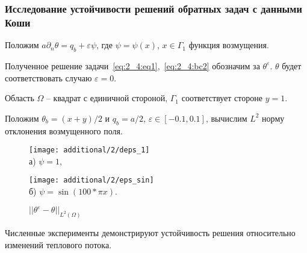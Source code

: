 \begin{frame}
    \frametitle{Исследование устойчивости решений обратных задач с данными Коши}
    Положим $a\partial_n \theta = q_b +\varepsilon \psi$, где $\psi = \psi(x)$, $x \in \Gamma_1$ функция возмущения.

    Полученное решение задачи~\eqref{eq:2_4:eq1},~\eqref{eq:2_4:bc2} обозначим за $\theta^{\varepsilon}$.
    $\theta$ будет соответствовать случаю $\varepsilon = 0$.

    Область $\Omega$ -- квадрат с единичной стороной, $\Gamma_1$ соответствует стороне $y = 1$.

    Положим $\theta_b = (x + y) / 2$ и $q_b = a / 2$, $\varepsilon \in [-0.1, 0.1]$,
    вычислим $L^2$ норму отклонения возмущенного поля.
    \begin{figure}[h!t]
        \begin{minipage}[b][][b]{0.4\linewidth}
            \centering
            \texttt{[image: additional/2/deps\_1]}\\ а) $\psi = 1,$
        \end{minipage}
        \hfill
        \begin{minipage}[b][][b]{0.4\linewidth}
            \centering
            \texttt{[image: additional/2/eps\_sin]} \\ б) $\psi = \sin (100 * \pi x)$.
        \end{minipage}
        \caption{$||\theta^\varepsilon - \theta||_{L^2(\Omega)}$}
        \label{fig:4_4:vareps}
    \end{figure}
    Численные эксперименты демонстрируют
    устойчивость решения относительно изменений теплового потока.
\end{frame}
